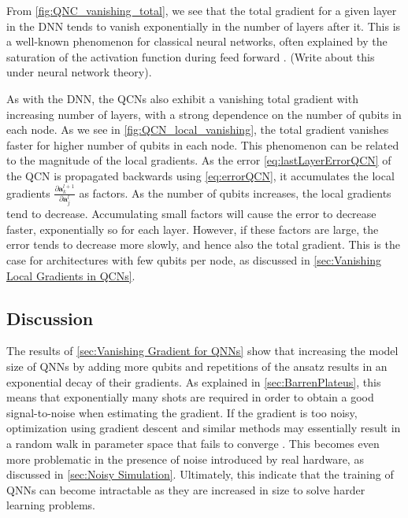 From \autoref{fig:QNC_vanishing_total}, we see that the total gradient for a given layer in the DNN tends to vanish exponentially in the number of layers after it. This is a well-known phenomenon for classical neural networks, often explained by the saturation of the activation function during feed forward \cite{shalevshwartz2017failures}. (Write about this under neural network theory).

As with the DNN, the QCNs also exhibit a vanishing total gradient with increasing number of layers, with a strong dependence on the number of qubits in each node. As we see in \autoref{fig:QCN_local_vanishing}, the total gradient vanishes faster for higher number of qubits in each node. This phenomenon can be related to the magnitude of the local gradients. As the error \autoref{eq:lastLayerErrorQCN} of the QCN is propagated backwards using \autoref{eq:errorQCN}, it accumulates the local gradients $\frac{\partial \boldsymbol{a}^{l+1}_k}{\partial \boldsymbol{a}^{l}_j}$ as factors. As the number of qubits increases, the local gradients tend to decrease. Accumulating small factors will cause the error to decrease faster, exponentially so for each layer. However, if these factors are large, the error tends to decrease more slowly, and hence also the total gradient. This is the case for architectures with few qubits per node, as discussed in \autoref{sec:Vanishing Local Gradients in QCNs}.

\subsection{Discussion}\label{sec:Vanishing Gradient Phenomenon Discussion}
The results of \autoref{sec:Vanishing Gradient for QNNs} show that increasing the model size of QNNs by adding more qubits and repetitions of the ansatz results in an exponential decay of their gradients. As explained in \autoref{sec:BarrenPlateus}, this means that exponentially many shots are required in order to obtain a good signal-to-noise when estimating the gradient. If the gradient is too noisy, optimization using gradient descent and similar methods may essentially result in a random walk in parameter space that fails to converge \cite{skolik2020layerwise}. This becomes even more problematic in the presence of noise introduced by real hardware, as discussed in \autoref{sec:Noisy Simulation}. Ultimately, this indicate that the training of QNNs can become intractable as they are increased in size to solve harder learning problems.    

